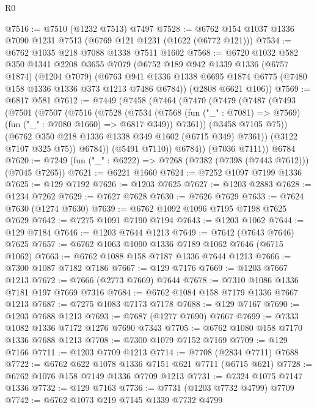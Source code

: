 \begin{lexlean}{R0}
\begin{coremodule}
@7516 := @7510 (@1232 @7513) @7497
@7528 := @6762 @154 @1037 @1336 @7090 @1231 @7513 (@6769 @121 @1231 (@1622 (@6772 @121)))
@7534 := @6762 @1035 @218 @7088 @1338 @7511 @1602
@7568 := @6720
    @1032
    @582
    @350
    @1341
    @2208
    @3655
    @7079
    (@6752
      @189
      @942
      @1339
      @1336
      (@6757 @1874)
      (@1204 @7079)
      (@6763 @941 @1336 @1338 @6695 @1874 @6775 (@7480 @158 @1336 @1336 @373 @1213 @7486 @6784))
      (@2808 @6621 @106))
@7569 := @6817 @581
@7612 := @7449
    (@7458
      (@7464
        (@7470
          (@7479
            (@7487
              (@7493
                (@7501
                  (@7507
                    (@7516
                      (@7528
                        (@7534
                          (@7568
                            (fun ("_" : @7081) => @7569)
                            (fun ("_" : @7080 @1660) => @6817 @349))
                          @7361))
                      (@3458 @7105 @75))
                    (@6762 @350 @218 @1336 @1338 @349 @1602 (@6715 @349) @7361))
                  (@3122 @7107 @325 @75))
                @6784))
            (@5491 @7110))
          @6784))
      (@7036 @7111))
    @6784
@7620 := @7249 (fun ("_" : @6222) => @7268 (@7382 (@7398 (@7443 @7612))) (@7045 @7265))
@7621 := @6221 @1660
@7624 := @7252 @1097 @7199 @1336
@7625 := @129 @7192
@7626 := @1203 @7625
@7627 := @1203 @2883
@7628 := @1234 @7262
@7629 := @7627 @7628
@7630 := @7626 @7629
@7633 := @7624 @7630 (@1274 @7630)
@7639 := @6762 @1092 @1096 @7195 @7198 @7625 @7629
@7642 := @7275 @1091 @7190 @7194
@7643 := @1203 @1062
@7644 := @129 @7184
@7646 := @1203 @7644 @1213
@7649 := @7642 (@7643 @7646) @7625
@7657 := @6762 @1063 @1090 @1336 @7189 @1062 @7646 (@6715 @1062)
@7663 := @6762 @1088 @158 @7187 @1336 @7644 @1213
@7666 := @7300 @1087 @7182 @7186
@7667 := @129 @7176
@7669 := @1203 @7667 @1213
@7672 := @7666 (@2773 @7669) @7644
@7678 := @7310 @1086 @1336 @7181 @197 @7669 @7316
@7684 := @6762 @1084 @158 @7179 @1336 @7667 @1213
@7687 := @7275 @1083 @7173 @7178
@7688 := @129 @7167
@7690 := @1203 @7688 @1213
@7693 := @7687 (@1277 @7690) @7667
@7699 := @7333 @1082 @1336 @7172 @1276 @7690 @7343
@7705 := @6762 @1080 @158 @7170 @1336 @7688 @1213
@7708 := @7300 @1079 @7152 @7169
@7709 := @129 @7166
@7711 := @1203 @7709 @1213
@7714 := @7708 (@2834 @7711) @7688
@7722 := @6762 @622 @1078 @1336 @7151 @621 @7711 (@6715 @621)
@7728 := @6762 @1076 @158 @7149 @1336 @7709 @1213
@7731 := @7324 @1075 @7147 @1336
@7732 := @129 @7163
@7736 := @7731 (@1203 @7732 @4799) @7709
@7742 := @6762 @1073 @219 @7145 @1339 @7732 @4799

\end{coremodule}
\end{lexlean}

